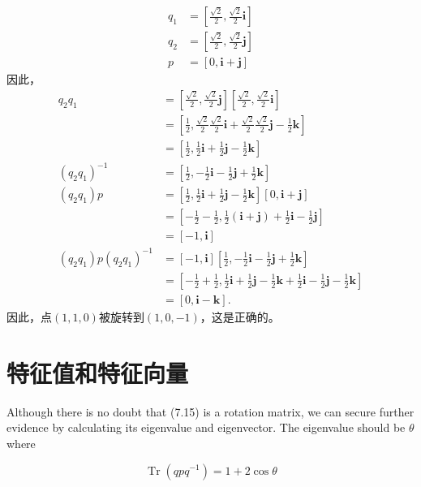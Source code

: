 $$
\begin{aligned}
q_{1} & =\left[\frac{\sqrt{2}}{2}, \frac{\sqrt{2}}{2} \mathbf{i}\right] \\
q_{2} & =\left[\frac{\sqrt{2}}{2}, \frac{\sqrt{2}}{2} \mathbf{j}\right] \\
p & =[0, \mathbf{i}+\mathbf{j}]
\end{aligned}
$$
因此，
$$
\begin{aligned}
q_{2} q_{1} & =\left[\frac{\sqrt{2}}{2}, \frac{\sqrt{2}}{2} \mathbf{j}\right]\left[\frac{\sqrt{2}}{2}, \frac{\sqrt{2}}{2} \mathbf{i}\right] \\
& =\left[\frac{1}{2}, \frac{\sqrt{2}}{2} \frac{\sqrt{2}}{2} \mathbf{i}+\frac{\sqrt{2}}{2} \frac{\sqrt{2}}{2} \mathbf{j}-\frac{1}{2} \mathbf{k}\right] \\
& =\left[\frac{1}{2}, \frac{1}{2} \mathbf{i}+\frac{1}{2} \mathbf{j}-\frac{1}{2} \mathbf{k}\right] \\
\left(q_{2} q_{1}\right)^{-1} & =\left[\frac{1}{2},-\frac{1}{2} \mathbf{i}-\frac{1}{2} \mathbf{j}+\frac{1}{2} \mathbf{k}\right] \\
\left(q_{2} q_{1}\right) p & =\left[\frac{1}{2}, \frac{1}{2} \mathbf{i}+\frac{1}{2} \mathbf{j}-\frac{1}{2} \mathbf{k}\right][0, \mathbf{i}+\mathbf{j}] \\
& =\left[-\frac{1}{2}-\frac{1}{2}, \frac{1}{2}(\mathbf{i}+\mathbf{j})+\frac{1}{2} \mathbf{i}-\frac{1}{2} \mathbf{j}\right] \\
& =[-1, \mathbf{i}] \\
\left(q_{2} q_{1}\right) p\left(q_{2} q_{1}\right)^{-1} & =[-1, \mathbf{i}]\left[\frac{1}{2},-\frac{1}{2} \mathbf{i}-\frac{1}{2} \mathbf{j}+\frac{1}{2} \mathbf{k}\right] \\
& =\left[-\frac{1}{2}+\frac{1}{2}, \frac{1}{2} \mathbf{i}+\frac{1}{2} \mathbf{j}-\frac{1}{2} \mathbf{k}+\frac{1}{2} \mathbf{i}-\frac{1}{2} \mathbf{j}-\frac{1}{2} \mathbf{k}\right] \\
& =[0, \mathbf{i}-\mathbf{k}] .
\end{aligned}
$$
因此，点$(1,1,0)$被旋转到$(1,0,-1)$，这是正确的。

\section{特征值和特征向量}
Although there is no doubt that (7.15) is a rotation matrix, we can secure further evidence by calculating its eigenvalue and eigenvector. The eigenvalue should be $\theta$ where

$$
\operatorname{Tr}\left(q p q^{-1}\right)=1+2 \cos \theta
$$

